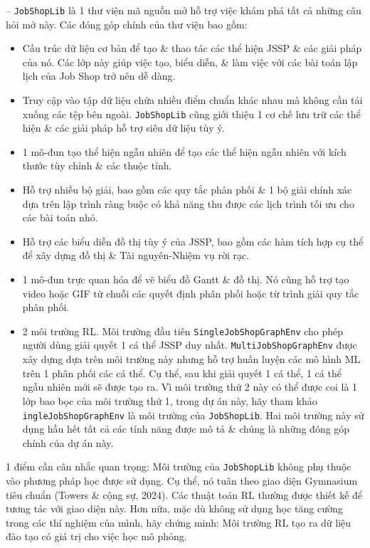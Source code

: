 \documentclass{article}
\begin{document}
\begin{itemize}
\begin{itemize}
\begin{itemize}
            -- {\tt JobShopLib} là 1 thư viện mã nguồn mở hỗ trợ việc khám phá tất cả những câu hỏi mở này. Các đóng góp chính của thư viện bao gồm:
            \begin{itemize}
                \item Cấu trúc dữ liệu cơ bản để tạo \& thao tác các thể hiện JSSP \& các giải pháp của nó. Các lớp này giúp việc tạo, biểu diễn, \& làm việc với các bài toán lập lịch của Job Shop trở nên dễ dàng.
                \item Truy cập vào tập dữ liệu chứa nhiều điểm chuẩn khác nhau mà không cần tải xuống các tệp bên ngoài. {\tt JobShopLib} cũng giới thiệu 1 cơ chế lưu trữ các thể hiện \& các giải pháp hỗ trợ siêu dữ liệu tùy ý.
                \item 1 mô-đun tạo thể hiện ngẫu nhiên để tạo các thể hiện ngẫu nhiên với kích thước tùy chỉnh \& các thuộc tính.
                \item Hỗ trợ nhiều bộ giải, bao gồm các quy tắc phân phối \& 1 bộ giải chính xác dựa trên lập trình ràng buộc có khả năng thu được các lịch trình tối ưu cho các bài toán nhỏ.
                \item Hỗ trợ các biểu diễn đồ thị tùy ý của JSSP, bao gồm các hàm tích hợp cụ thể để xây dựng đồ thị \& Tài nguyên-Nhiệm vụ rời rạc.
                \item 1 mô-đun trực quan hóa để vẽ biểu đồ Gantt \& đồ thị. Nó cũng hỗ trợ tạo video hoặc GIF từ chuỗi các quyết định phân phối hoặc từ trình giải quy tắc phân phối.
                \item 2 môi trường RL. Môi trường đầu tiên {\tt SingleJobShopGraphEnv} cho phép người dùng giải quyết 1 cá thể JSSP duy nhất. {\tt MultiJobShopGraphEnv} được xây dựng dựa trên môi trường này nhưng hỗ trợ huấn luyện các mô hình ML trên 1 phân phối các cá thể. Cụ thể, sau khi giải quyết 1 cá thể, 1 cá thể ngẫu nhiên mới sẽ được tạo ra. Vì môi trường thứ 2 này có thể được coi là 1 lớp bao bọc của môi trường thứ 1, trong dự án này, hãy tham khảo {\tt ingleJobShopGraphEnv} là môi trường của {\tt JobShopLib}. Hai môi trường này sử dụng hầu hết tất cả các tính năng được mô tả \& chúng là những đóng góp chính của dự án này.
            \end{itemize}
            1 điểm cần cân nhắc quan trọng: Môi trường của {\tt JobShopLib} không phụ thuộc vào phương pháp học được sử dụng. Cụ thể, nó tuân theo giao diện Gymnasium tiêu chuẩn (Towers \& cộng sự, 2024). Các thuật toán RL thường được thiết kế để tương tác với giao diện này. Hơn nữa, mặc dù không sử dụng học tăng cường trong các thí nghiệm của mình, hãy chứng minh: Môi trường RL tạo ra dữ liệu đào tạo có giá trị cho việc học mô phỏng.

\end{itemize}
\end{itemize}
\end{itemize}
\end{document}
